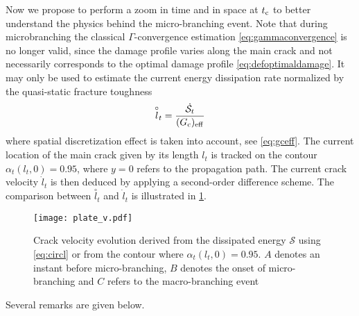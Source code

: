 Now we propose to perform a zoom in time and in space at $t_{\mathrm{c}}$ to better understand the physics behind the micro-branching event. Note that during microbranching the classical $\Gamma$-convergence estimation \eqref{eq:gammaconvergence} is no longer valid, since the damage profile varies along the main crack and not necessarily corresponds to the optimal damage profile \eqref{eq:defoptimaldamage}. It may only be used to estimate the current energy dissipation rate normalized by the quasi-static fracture toughness
\begin{equation} \label{eq:circl}
\overset{\circ}{l}_t=\frac{\dot{\mathcal{S}}_t}{(G_\mathrm{c})_\mathrm{eff}}
\end{equation}
where spatial discretization effect is taken into account, see \eqref{eq:gceff}. The current location of the main crack given by its length $l_t$ is tracked on the contour $\alpha_t(l_t,0)=0.95$, where $y=0$ refers to the propagation path. The current crack velocity $\dot{l}_t$ is then deduced by applying a second-order difference scheme. The comparison between $\overset{\circ}{l}_t$ and $\dot{l}_t$ is illustrated in \cref{fig:plate-v}.
\begin{figure}[htbp]
\centering
\texttt{[image: plate\_v.pdf]}
\caption{Crack velocity evolution derived from the dissipated energy $\mathcal{S}$ using \eqref{eq:circl} or from the contour where $\alpha_t(l_t,0)=0.95$. $A$ denotes an instant before micro-branching, $B$ denotes the onset of micro-branching and $C$ refers to the macro-branching event} \label{fig:plate-v}
\end{figure}
Several remarks are given below.
